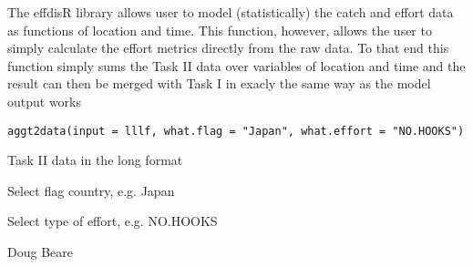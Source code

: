 \documentclass[letterpaper]{book}
\begin{document}
%
\begin{Description}\relax
The effdisR library allows user to model (statistically) the catch and effort data as functions of location and time. This function, however, allows the user to simply calculate the effort metrics directly from the raw data. To that end this function simply sums the Task II data over variables of location and time and the result can then be merged with Task I in exacly the same way as the  model output works
\end{Description}
%
\begin{Usage}
\begin{verbatim}
aggt2data(input = lllf, what.flag = "Japan", what.effort = "NO.HOOKS")
\end{verbatim}
\end{Usage}
%
\begin{Arguments}
\begin{ldescription}
\item[\code{input}] 
Task II data in the long format

\item[\code{what.flag}] 
Select flag country, e.g. Japan

\item[\code{what.effort}] 
Select type of effort, e.g. NO.HOOKS

\end{ldescription}
\end{Arguments}
%
\begin{Author}\relax
Doug Beare
\end{Author}
%
\begin{Examples}
\end{Examples}
\end{document}
